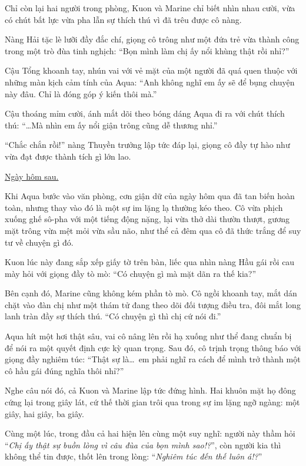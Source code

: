 \documentclass[../main.tex]{subfiles}
\begin{document}
Chỉ còn lại hai người trong phòng, Kuon và Marine chỉ biết nhìn nhau cười, vừa có chút bất lực vừa pha lẫn sự thích thú vì đã trêu được cô nàng.

Nàng Hải tặc lè lưỡi đầy đắc chí, giọng cô trông như một đứa trẻ vừa thành công trong một trò đùa tinh nghịch: ``Bọn mình làm chị ấy nổi khùng thật rồi nhỉ?''

Cậu Tổng khoanh tay, nhún vai với vẻ mặt của một người đã quá quen thuộc với những màn kịch cảm tính của Aqua: ``Anh không nghĩ em ấy sẽ để bụng chuyện này đâu. Chỉ là đóng góp ý kiến thôi mà.''

Cậu thoáng mỉm cười, ánh mắt dõi theo bóng dáng Aqua đi ra với chút thích thú: ``\dots Mà nhìn em ấy nổi giận trông cũng dễ thương nhỉ.''

``Chắc chắn rồi!'' nàng Thuyền trưởng lập tức đáp lại, giọng cô đầy tự hào như vừa đạt được thành tích gì lớn lao.

\begin{center}
  \uline{Ngày hôm sau.}
\end{center}

Khi Aqua bước vào văn phòng, cơn giận dữ của ngày hôm qua đã tan biến hoàn toàn, nhưng thay vào đó là một sự im lặng lạ thường kéo theo. Cô vừa phịch xuống ghế sô-pha với một tiếng động nặng, lại vừa thở dài thườn thượt, gương mặt trông vừa mệt mỏi vừa sầu não, như thể cả đêm qua cô đã thức trắng để suy tư về chuyện gì đó.

Kuon lúc này đang sắp xếp giấy tờ trên bàn, liếc qua nhìn nàng Hầu gái rồi cau mày hỏi với giọng đầy tò mò: ``Có chuyện gì mà mặt dãn ra thế kia?''

Bên cạnh đó, Marine cũng không kém phần tò mò. Cô ngồi khoanh tay, mắt dán chặt vào đàn chị như một thám tử đang theo dõi đối tượng điều tra, đôi mắt long lanh tràn đầy sự thích thú. ``Có chuyện gì thì chị cứ nói đi.''

Aqua hít một hơi thật sâu, vai cô nâng lên rồi hạ xuống như thể đang chuẩn bị để nói ra một quyết định cực kỳ quan trọng. Sau đó, cô trịnh trọng thông báo với giọng đầy nghiêm túc: ``Thật sự là\dots\ em phải nghĩ ra cách để mình trở thành một cô hầu gái đúng nghĩa thôi nhỉ?''

Nghe câu nói đó, cả Kuon và Marine lập tức đứng hình. Hai khuôn mặt họ đông cứng lại trong giây lát, cứ thế thời gian trôi qua trong sự im lặng ngỡ ngàng: một giây, hai giây, ba giây.

Cùng một lúc, trong đầu cả hai hiện lên cùng một suy nghĩ: người này thầm hỏi ``\textit{Chị ấy thật sự buồn lòng vì câu đùa của bọn mình sao!?}'', còn người kia thì không thể tin được, thốt lên trong lòng: ``\textit{Nghiêm túc đến thế luôn á!?}''
\end{document}
